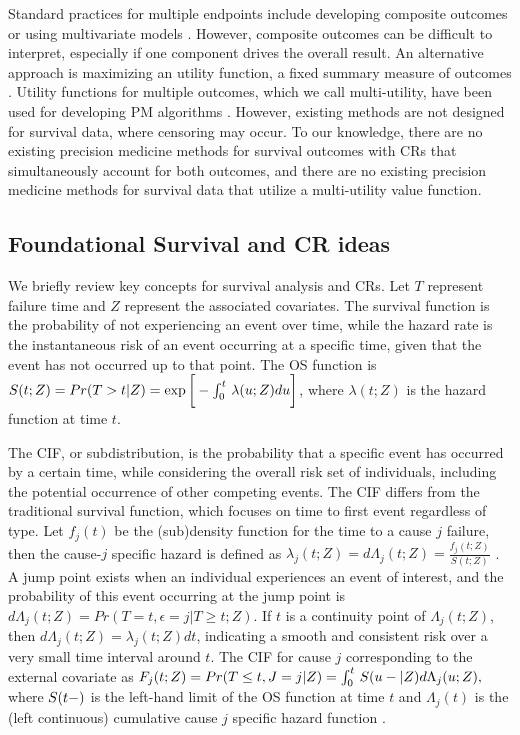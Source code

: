 Standard practices for multiple endpoints include developing composite outcomes \\\citep{Neuhauser2006, Jetsupphasuk2023} 
or using multivariate models \citep{TeixeiraPinto2009, Wu2024}. However, composite outcomes can be difficult to interpret, especially if one component drives the overall result. An alternative approach is maximizing an utility function, a fixed summary measure of outcomes \citep{hayes2022}. Utility functions for multiple outcomes, which we call multi-utility, have been used for developing PM algorithms \citep{Butler2018, jiang_precision_2021, zitovsky2023}. However, existing methods are not designed for survival data, where censoring may occur. To our knowledge, there are no existing precision medicine methods for survival outcomes with CRs that simultaneously account for both outcomes, and there are no existing precision medicine methods for survival data that utilize a multi-utility value function.

\subsection{Foundational Survival and CR ideas}
We briefly review key concepts for survival analysis and CRs.
Let $T$ represent failure time and $Z$ represent the associated covariates. The survival function is the probability of not experiencing an event over time, while the hazard rate is the instantaneous risk of an event occurring at a specific time, given that the event has not occurred up to that point. The OS function is $S(t;Z) = Pr(T>t|Z) = \exp{\bigg[-\int_0^t\,\lambda(u;Z)du\bigg]}$, where $\lambda(t;Z)$ is the hazard function at time $t$.

The CIF, or subdistribution, is the probability that a specific event has occurred by a certain time, while considering the overall risk set of individuals, including the potential occurrence of other competing events. The CIF differs from the traditional survival function, which focuses on time to first event regardless of type. Let $f_j(t)$ be the (sub)density function for the time to a cause $j$ failure, then the cause-$j$ specific hazard is defined as
$\lambda_j(t;Z) =  d\Lambda_j(t;Z) = \frac{f_j(t;Z)}{S(t;Z)}$ \citep{kalbfleisch1980statistical}.
A jump point exists when an individual experiences an event of interest, and the probability of this event occurring at the jump point is $d\Lambda_j(t;Z) = Pr(T=t, \epsilon = j|T \ge t; Z)$. If $t$ is a continuity point of $\Lambda_j(t;Z)$, then $d\Lambda_j(t;Z) = \lambda_j(t;Z)dt$, indicating a smooth and consistent risk over a very small time interval around $t$. 
The CIF for cause $j$ corresponding to the external covariate as $F_j(t;Z) = Pr(T\leq t, J = j| Z) = \int_0^t\, S(u-|Z)d\Lambda_j(u;Z),$ where $S(t-)$ is the left-hand limit of the OS function at time $t$ and $\Lambda_j(t)$ is the (left continuous) cumulative cause $j$ specific hazard function \citep{kalbfleisch1980statistical}. 

 
